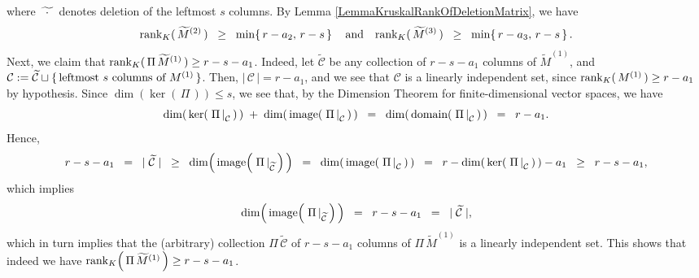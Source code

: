 where $\widetilde{{\color{white}\cdot}\cdot{\color{white}\cdot}}$ denotes deletion of the leftmost $s$ columns.
By Lemma \ref{LemmaKruskalRankOfDeletionMatrix}, we have
\begin{equation*}
\textnormal{rank}_{K}(\,\widetilde{M}^{(2)}\,) \;\; \geq \;\; \min\!\left\{\,r-a_{2},\,r-s\,\right\}
\quad\textnormal{and}\quad
\textnormal{rank}_{K}(\,\widetilde{M}^{(3)}\,) \;\; \geq \;\; \min\!\left\{\,r-a_{3},\,r-s\,\right\}.
\end{equation*}
Next, we claim that $\textnormal{rank}_{K}(\,\Pi\,\widetilde{M}^{(1)}\,) \geq r - s - a_{1}$.
Indeed, let $\widetilde{\mathcal{C}}$ be any collection of $r - s - a_{1}$ columns of $\widetilde{M}^{(1)}$,
and $\mathcal{C} := \widetilde{\mathcal{C}} \sqcup \{\,\textnormal{leftmost $s$ columns of $M^{(1)}$}\,\}$.
Then, $\left\vert\,\mathcal{C}\,\right\vert = r - a_{1}$, and we see that $\mathcal{C}$ is a linearly independent
set, since $\textnormal{rank}_{K}(\,M^{(1)}\,) \geq r - a_{1}$ by hypothesis.
Since $\dim\!\left(\ker\!\left(\,\Pi\,\right)\right) \leq s$, we see that,
by the Dimension Theorem for finite-dimensional vector spaces, we have
\begin{equation*}
\dim\!\left(\,\ker\!\left(\,\left.\Pi\,\right\vert_{\mathcal{C}}\,\right)\,\right)
\; + \;
\dim\!\left(\,\textnormal{image}\!\left(\,\left.\Pi\,\right\vert_{\mathcal{C}}\,\right)\,\right)
\;\; = \;\;
\dim\!\left(\,\textnormal{domain}\!\left(\,\left.\Pi\,\right\vert_{\mathcal{C}}\,\right)\,\right)
\;\; = \;\; r - a_{1}.
\end{equation*}
Hence,
\begin{equation*}
r - s - a_{1}
\;\; = \;\; \vert\;\widetilde{\mathcal{C}}\;\vert
\;\; \geq \;\; \dim\!\left(\,\textnormal{image}\!\left(\,\left.\Pi\,\right\vert_{\widetilde{\mathcal{C}}}\,\right)\,\right)
\;\; = \;\; \dim\!\left(\,\textnormal{image}\!\left(\,\left.\Pi\,\right\vert_{\mathcal{C}}\,\right)\,\right)
\;\; = \;\; r - \dim\!\left(\,\ker\!\left(\,\left.\Pi\,\right\vert_{\mathcal{C}}\,\right)\,\right) - a_{1}
\;\; \geq \;\; r - s - a_{1},
\end{equation*}
which implies
\begin{equation*}
\dim\!\left(\,\textnormal{image}\!\left(\,\left.\Pi\,\right\vert_{\widetilde{\mathcal{C}}}\,\right)\,\right)
\;\; = \;\; r - s - a_{1}
\;\; = \;\; \vert\;\widetilde{\mathcal{C}}\;\vert,
\end{equation*}
which in turn implies that the (arbitrary) collection $\Pi\,\widetilde{\mathcal{C}}$ of $r - s - a_{1}$ columns of
$\Pi\,\widetilde{M}^{(1)}$ is a linearly independent set.
This shows that indeed we have $\textnormal{rank}_{K}\!\left(\,\Pi\,\widetilde{M}^{(1)}\,\right) \geq r - s - a_{1}$.

